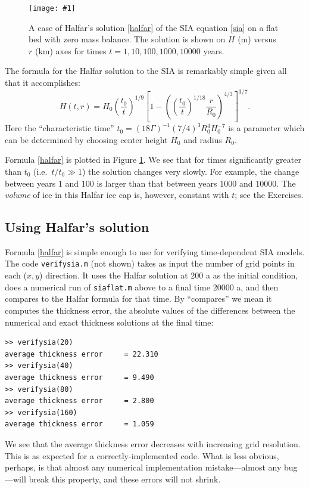 \documentclass[letterpaper,final,12pt,reqno]{amsart}
\newcommand{\onefigsize}[3]{
\begin{figure}[ht]
\centering
\texttt{[image: \#1]}
\caption{#2}
\label{fig:#1}
\end{figure}}
\begin{document}
\onefigsize{siascaling}{A case of Halfar's solution \eqref{halfar} of the SIA equation \eqref{sia} on a flat bed with zero mass balance.  The solution is shown on $H$ (m) versus $r$ (km) axes for times $t=1,10,100,1000,10000$ years.}{5.5in}

The formula for the Halfar solution to the SIA is remarkably simple given all that it accomplishes:
\begin{equation}
H(t,r) = H_0 \left(\frac{t_0}{t}\right)^{1/9} \left[1 - \left(\left(\frac{t_0}{t}\right)^{1/18} \frac{r}{R_0}\right)^{4/3}\right]^{3/7}. \label{halfar}
\end{equation}
Here the ``characteristic time'' $t_0 = (18 \Gamma)^{-1} (7/4)^3 R_0^4 H_0^{-7}$ is a parameter which can be determined by choosing center height $H_0$ and radius $R_0$.

Formula \eqref{halfar} is plotted in Figure \ref{fig:siascaling}.  We see that for times significantly greater than $t_0$ (i.e.~$t/t_0 \gg 1$) the solution changes very slowly.  For example, the change between years $1$ and $100$ is larger than that between years $1000$ and $10000$.  The \emph{volume} of ice in this Halfar ice cap is, however, constant with $t$; see the Exercises.

\subsection*{Using Halfar's solution}  Formula \eqref{halfar} is simple enough to use for verifying time-dependent SIA models.  The code \texttt{verifysia.m} (not shown) takes as input the number of grid points in each ($x,y$) direction.  It uses the Halfar solution at 200 a as the initial condition, does a numerical run of \texttt{siaflat.m} above to a final time 20000 a, and then compares to the Halfar formula for that time.  By ``compares'' we mean it computes the thickness error, the absolute values of the differences between the numerical and exact thickness solutions at the final time:
\small
\begin{verbatim}
>> verifysia(20)
average thickness error     = 22.310
>> verifysia(40)
average thickness error     = 9.490
>> verifysia(80)
average thickness error     = 2.800
>> verifysia(160)
average thickness error     = 1.059
\end{verbatim}
\normalsize
We see that the average thickness error decreases with increasing grid resolution.  This is as expected for a correctly-implemented code.  What is less obvious, perhaps, is that almost any numerical implementation mistake---almost any bug---will break this property, and these errors will not shrink.
\end{document}
